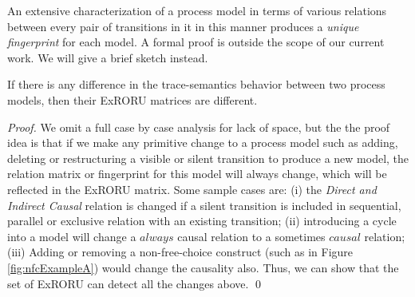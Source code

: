 \documentclass{llncs}
\begin{document}

An extensive characterization of a process model in terms of various relations between every pair of transitions in it in this manner produces a \textit{unique fingerprint} for each model. A formal proof is outside the scope of our current work. We will give a brief sketch instead. %

\begin{theorem}[Uniqueness]\label{the:uniqueness}
If there is any difference in the trace-semantics behavior between two process models, then their ExRORU matrices are different.
\end{theorem}
\begin{proof}
We omit a full case by case analysis for lack of space, but the the proof idea is that if we make any primitive change to a process model such as adding, deleting or restructuring a visible or silent transition to produce a new model, the relation matrix or fingerprint for this model will always change, which will be reflected in the ExRORU matrix.  Some sample cases are: (i) the \textit{Direct and Indirect Causal} relation is changed if a silent transition is included in sequential, parallel or exclusive relation with an existing transition; (ii) introducing a cycle into a model will change a $always$ causal relation to a sometimes $causal$ relation; (iii) Adding or removing a non-free-choice construct (such as in Figure \ref{fig:nfcExampleA}) would change the causality also. Thus, we can show that the set of ExRORU can detect all the changes above. \qed
\end{proof}
\end{document}
